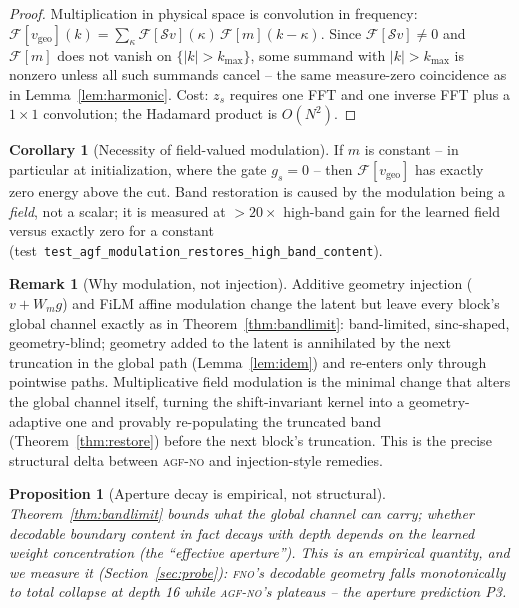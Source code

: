 \documentclass[11pt]{article}
\newtheorem{proposition}{Proposition}
\theoremstyle{definition}
\newtheorem{corollary}{Corollary}
\newtheorem{remark}{Remark}
\newcommand{\fno}{\textsc{fno}}
\newcommand{\agfno}{\textsc{agf-no}}
\begin{document}
\begin{proof}
Multiplication in physical space is convolution in frequency:
$\mathcal{F}[v_{\mathrm{geo}}](k) = \sum_{\kappa}
\mathcal{F}[\mathcal{S} v](\kappa)\, \mathcal{F}[m](k - \kappa)$. Since
$\mathcal{F}[\mathcal{S} v] \neq 0$ and $\mathcal{F}[m]$ does not vanish on
$\{|k| > k_{\max}\}$, some summand with $|k| > k_{\max}$ is nonzero unless
all such summands cancel -- the same measure-zero coincidence as in
Lemma~\ref{lem:harmonic}. Cost: $z_s$ requires one FFT and one inverse FFT
plus a $1 \times 1$ convolution; the Hadamard product is $O(N^2)$.
\end{proof}

\begin{corollary}[Necessity of field-valued modulation]
If $m$ is constant -- in particular at initialization, where the gate $g_s = 0$
-- then $\mathcal{F}[v_{\mathrm{geo}}]$ has exactly zero energy above the
cut. Band restoration is caused by the modulation being a \emph{field}, not
a scalar; it is measured at $> 20 \times$ high-band gain for the learned
field versus exactly zero for a constant
(test\ \texttt{test\_agf\_modulation\_restores\_high\_band\_content}).
\end{corollary}

\begin{remark}[Why modulation, not injection]
\label{rem:injection}
Additive geometry injection ($v + W_m g$) and FiLM affine modulation change
the latent but leave every block's global channel exactly as in
Theorem~\ref{thm:bandlimit}: band-limited, sinc-shaped, geometry-blind;
geometry added to the latent is annihilated by the next truncation in the
global path (Lemma~\ref{lem:idem}) and re-enters only through pointwise
paths. Multiplicative field modulation is the minimal change that alters the
global channel itself, turning the shift-invariant kernel into a
geometry-adaptive one and provably re-populating the truncated band
(Theorem~\ref{thm:restore}) before the next block's truncation. This is the
precise structural delta between \agfno{} and injection-style remedies.
\end{remark}

\begin{proposition}[Aperture decay is empirical, not structural]
\label{prop:bandlimit}
Theorem~\ref{thm:bandlimit} bounds what the global channel \emph{can} carry;
whether decodable boundary content in fact decays with depth depends on the
learned weight concentration (the ``effective aperture''). This is an
empirical quantity, and we measure it (Section~\ref{sec:probe}):
\fno{}'s decodable geometry falls monotonically to total collapse at depth
16 while \agfno{}'s plateaus -- the aperture prediction P3.
\end{proposition}
\end{document}
